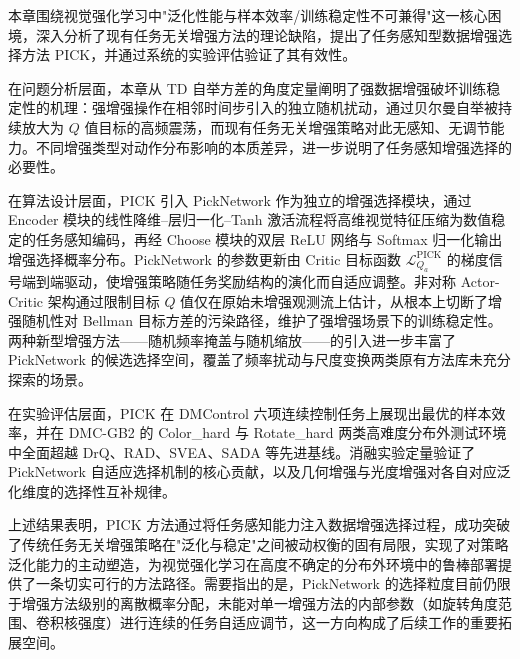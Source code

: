 
本章围绕视觉强化学习中"泛化性能与样本效率/训练稳定性不可兼得"这一核心困境，深入分析了现有任务无关增强方法的理论缺陷，提出了任务感知型数据增强选择方法 PICK，并通过系统的实验评估验证了其有效性。

在问题分析层面，本章从 TD 自举方差的角度定量阐明了强数据增强破坏训练稳定性的机理：强增强操作在相邻时间步引入的独立随机扰动，通过贝尔曼自举被持续放大为 $Q$ 值目标的高频震荡，而现有任务无关增强策略对此无感知、无调节能力。不同增强类型对动作分布影响的本质差异，进一步说明了任务感知增强选择的必要性。

在算法设计层面，PICK 引入 PickNetwork 作为独立的增强选择模块，通过 Encoder 模块的线性降维--层归一化--Tanh 激活流程将高维视觉特征压缩为数值稳定的任务感知编码，再经 Choose 模块的双层 ReLU 网络与 Softmax 归一化输出增强选择概率分布。PickNetwork 的参数更新由 Critic 目标函数 $\mathcal{L}_{Q_a}^{\text{PICK}}$ 的梯度信号端到端驱动，使增强策略随任务奖励结构的演化而自适应调整。非对称 Actor-Critic 架构通过限制目标 $Q$ 值仅在原始未增强观测流上估计，从根本上切断了增强随机性对 Bellman 目标方差的污染路径，维护了强增强场景下的训练稳定性。两种新型增强方法——随机频率掩盖与随机缩放——的引入进一步丰富了 PickNetwork 的候选选择空间，覆盖了频率扰动与尺度变换两类原有方法库未充分探索的场景。

在实验评估层面，PICK 在 DMControl 六项连续控制任务上展现出最优的样本效率，并在 DMC-GB2 的 Color\_hard 与 Rotate\_hard 两类高难度分布外测试环境中全面超越 DrQ、RAD、SVEA、SADA 等先进基线。消融实验定量验证了 PickNetwork 自适应选择机制的核心贡献，以及几何增强与光度增强对各自对应泛化维度的选择性互补规律。

上述结果表明，PICK 方法通过将任务感知能力注入数据增强选择过程，成功突破了传统任务无关增强策略在"泛化与稳定"之间被动权衡的固有局限，实现了对策略泛化能力的主动塑造，为视觉强化学习在高度不确定的分布外环境中的鲁棒部署提供了一条切实可行的方法路径。需要指出的是，PickNetwork 的选择粒度目前仍限于增强方法级别的离散概率分配，未能对单一增强方法的内部参数（如旋转角度范围、卷积核强度）进行连续的任务自适应调节，这一方向构成了后续工作的重要拓展空间。
